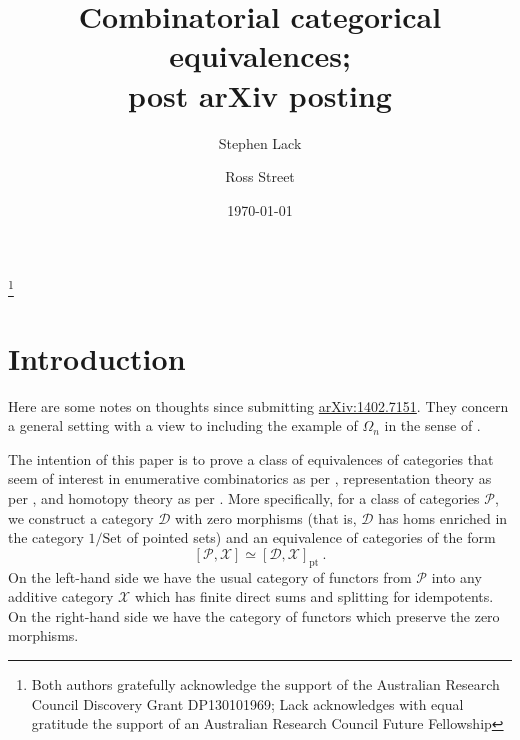 \documentclass[a4paper,12pt,reqno]{amsart}
\theoremstyle{definition}
\theoremstyle{fact}
\theoremstyle{genquest}
\theoremstyle{step}
\def\CD{{\mathscr D}}
\def\CP{{\mathscr P}}
\def\CX{{\mathscr X}}
\begin{document}
\title{Combinatorial categorical equivalences; \\ post arXiv posting}

\author{Stephen Lack}
\address{Department of Mathematics, Macquarie University, NSW 2109, Australia}

\author{Ross Street}
\address{Department of Mathematics, Macquarie University, NSW 2109, Australia}

\thanks{Both authors gratefully acknowledge the support of the Australian Research Council Discovery Grant DP130101969; Lack acknowledges with equal gratitude the support of an Australian Research Council Future Fellowship}

\date{\today}
\maketitle

\tableofcontents

\section{Introduction}

Here are some notes on thoughts since submitting \url{arXiv:1402.7151}. 
They concern a general setting with a view to including the example of 
$\Omega_n$ in the sense of \cite{UPMT}.

The intention of this paper is to prove a class of equivalences of categories that 
seem of interest in enumerative combinatorics as per \cite{Species},
representation theory as per \cite{CEF2012}, 
and homotopy theory as per \cite{Berger1996}.
More specifically, for a class of categories $\CP$, we construct a category $\CD$
with zero morphisms (that is, $\CD$ has homs enriched in the category
$1/\mathrm{Set}$ of pointed sets) and an equivalence of categories of the form
\begin{equation}\label{basicequ}
[\CP,\CX] \simeq [\CD,\CX]_{\mathrm{pt}} \ .
\end{equation}
On the left-hand side we have the usual category of functors from
$\CP$ into any additive category $\CX$ which has finite direct sums
and splitting for idempotents. 
On the right-hand side we have the category of functors which preserve
the zero morphisms.
\end{document}
